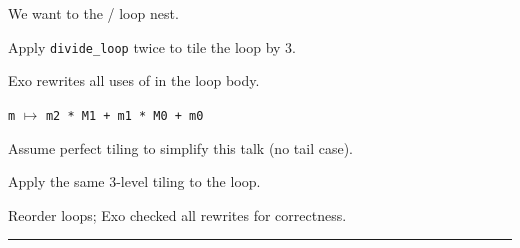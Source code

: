 \newpage
{}

{\large

}

{\LARGE
We want to  the / loop nest.

}


\newpage
{}

{\large

}

{\LARGE
Apply \texttt{divide\_loop} twice to tile the  loop by 3.

}

\newpage
{}

{\large

}

{\LARGE
Exo rewrites all uses of  in the loop body.

\texttt{m} $\mapsto$ \texttt{m2 * M1 + m1 * M0 + m0}

}

\newpage
{}

{\large

}

{\LARGE
Assume perfect tiling to simplify this talk (no tail case).

}

\newpage
{}

{\large

}

{\LARGE
Apply the same 3-level tiling to the  loop.

}

\newpage
{}

{\large

}

{\LARGE
Reorder loops; Exo checked all rewrites for correctness.

}

\newpage
{}

{\large

}

\vspace{1mm}
\hrule

{\large

}

\newpage
{}

